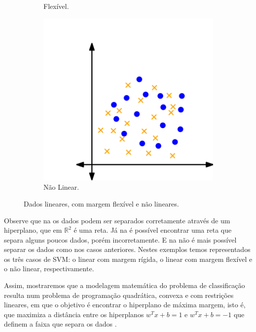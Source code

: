 \documentclass[12pt,a4paper]{scrartcl}
\def\RR{\mathds{R}}
\theoremstyle{definition}%
\begin{document}
\begin{figure}[!ht]
\begin{subfigure}[!ht]{0.3\textwidth}
	\caption{Flexível. \label{fig:classificacao_dados:hiperplano_SVM_flexivel}}
\end{subfigure}
\begin{subfigure}[!ht]{0.3\textwidth}
	\centering
	\includegraphics[width=\textwidth]{hiperplano_SVM_nao_linear}
	\caption{Não Linear. \label{fig:classificacao_dados:hiperplano_SVM_nao_linear}}
\end{subfigure}
\caption{Dados lineares, com margem flexível e não lineares. \label{fig:classificacao_dados}}
\end{figure}

Observe que na  os dados podem ser separados corretamente através de um hiperplano, que em $\RR^{2}$ é uma reta. Já na  é possível encontrar uma reta que separa alguns poucos dados, porém incorretamente. E na  não é mais possível separar os dados como nos casos anteriores. Nestes exemplos temos representados os três casos de SVM: o linear com margem rígida, o linear com margem flexível e o não linear, respectivamente.

Assim, mostraremos que a modelagem matemática do problema de classificação resulta num problema de programação quadrática, convexa e com restrições lineares, em que o objetivo é encontrar o hiperplano de máxima margem, isto é, que maximiza a distância entre os hiperplanos $w^{T}x+b = 1$ e $w^{T}x+b = -1$ que definem a faixa que separa os dados \cite{Evelin2017}. 
\end{document}
